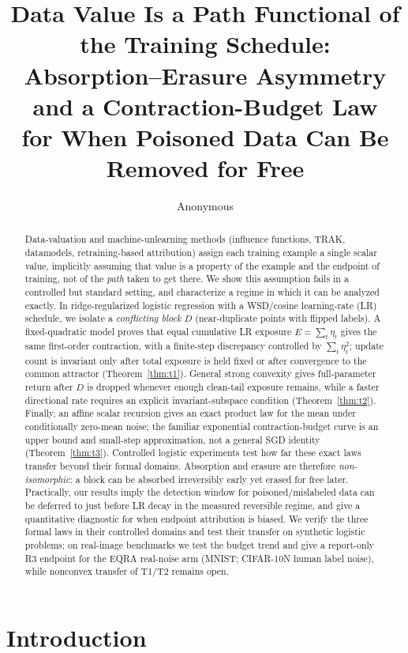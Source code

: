 \documentclass{article}
\title{Data Value Is a Path Functional of the Training Schedule:\\
Absorption--Erasure Asymmetry and a Contraction-Budget Law\\
for When Poisoned Data Can Be Removed for Free}
\author{Anonymous}
\newcommand{\Expo}{E}         %
\begin{document}
\maketitle

\begin{abstract}
Data-valuation and machine-unlearning methods (influence functions, TRAK, datamodels,
retraining-based attribution) assign each training example a single scalar value, implicitly
assuming that value is a property of the example and the endpoint of training, not of the
\emph{path} taken to get there. We show this assumption fails in a controlled but standard
setting, and characterize a regime in which it can be analyzed exactly. In ridge-regularized
logistic regression with a WSD/cosine learning-rate (LR) schedule, we isolate a
\emph{conflicting block} $D$ (near-duplicate points with flipped labels). A fixed-quadratic
model proves that equal cumulative LR exposure $\Expo=\sum_t\eta_t$ gives the same first-order
contraction, with a finite-step discrepancy controlled by $\sum_t\eta_t^2$; update count is
invariant only after total exposure is held fixed or after convergence to the common attractor
(Theorem~\ref{thm:t1}). General strong convexity gives full-parameter return after $D$ is
dropped whenever enough clean-tail exposure remains, while a faster directional rate requires
an explicit invariant-subspace condition (Theorem~\ref{thm:t2}). Finally, an affine scalar
recursion gives an exact product law for the mean under conditionally zero-mean noise; the
familiar exponential contraction-budget curve is an upper bound and small-step approximation,
not a general SGD identity (Theorem~\ref{thm:t3}). Controlled logistic experiments test how far
these exact laws transfer beyond their formal domains. Absorption and erasure are therefore
\emph{non-isomorphic}: a block can be absorbed irreversibly early yet erased for free later.
Practically, our results imply the detection window for poisoned/mislabeled data can be
deferred to just before LR decay in the measured reversible regime, and give a quantitative
diagnostic for when endpoint attribution is biased. We verify the three formal laws in their
controlled domains and test their transfer on synthetic logistic problems; on real-image
benchmarks we test the budget trend and give a report-only R3
endpoint for the EQRA real-noise arm (MNIST; CIFAR-10N human label noise), while
nonconvex transfer of T1/T2 remains open.
\end{abstract}

\section{Introduction}
\label{sec:intro}
\end{document}
